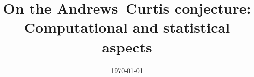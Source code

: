 \documentclass{amsart}
\title[On the Andrews--Curtis conjecture]{On the Andrews--Curtis conjecture: \\ Computational and statistical aspects}
\date{\today}
\begin{document}
	
	\maketitle
	\tableofcontents
	
	
	
	
	
	
	
	\appendix
%	
	
	
	
	\sloppy
	\printbibliography
	\todos
\end{document}
